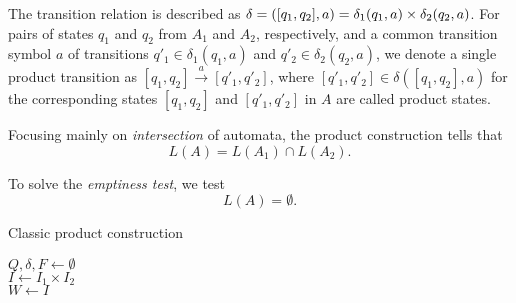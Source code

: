 The transition relation is described as $\delta = \\ ([q_1, q_2], a) = \delta_1(q_1, a) \times \delta_2(q_2, a)$. For pairs of states $q_1$ and $q_2$ from $A_1$ and $A_2$, respectively, and a common transition symbol $a$ of transitions $q'_1 \in \delta_1(q_1, a)$ and $q'_2 \in \delta_2(q_2,a)$, we denote a single product transition as $[q_1, q_2] \xrightarrow{a} [q'_1, q'_2]$, where $[q'_1, q'_2] \in \delta([q_1, q_2], a)$ for the corresponding states $[q_1, q_2]$ and $[q'_1, q'_2]$ in $A$ are called product states.

Focusing mainly on \emph{intersection} of automata, the product construction tells that
$$ L(A) = L(A_1) \cap L(A_2) \text{.} $$

To solve the \emph{emptiness test}, we test
$$ L(A) = \emptyset \text{.}$$

\begin{algorithm}
\caption{Classic product construction}\label{productConstructionAlg}
\DontPrintSemicolon
{}
\BlankLine
$Q, \delta, F \gets \emptyset$ \\
$I \gets I_1 \times I_2$ \\
$W \gets  I$

\end{algorithm}\DecMargin{1em}



